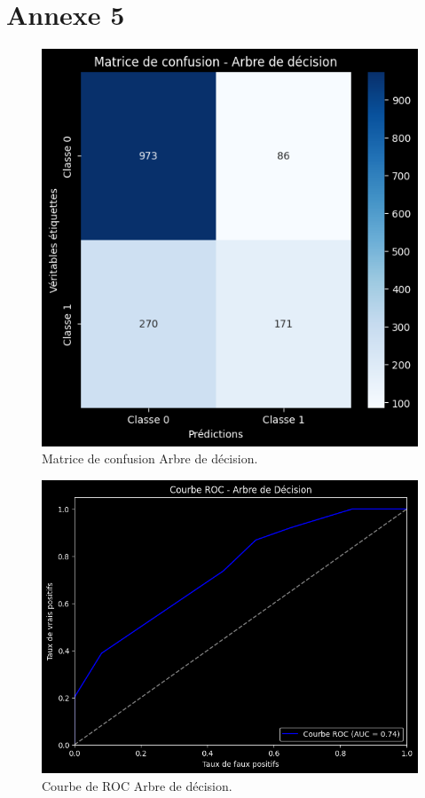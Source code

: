 \section*{Annexe 5}
\label{sec:annexe5}
\begin{figure}[H]
\centering
\includegraphics[width=1\textwidth]{figures/MatriceArbre.png}
\caption{Matrice de confusion Arbre de décision.}
\label{fig:annexe5}
\end{figure}


\begin{figure}[H]
\centering
\includegraphics[width=1\textwidth]{figures/ROCArbre.png}
\caption{Courbe de ROC Arbre de décision.}
\end{figure}


